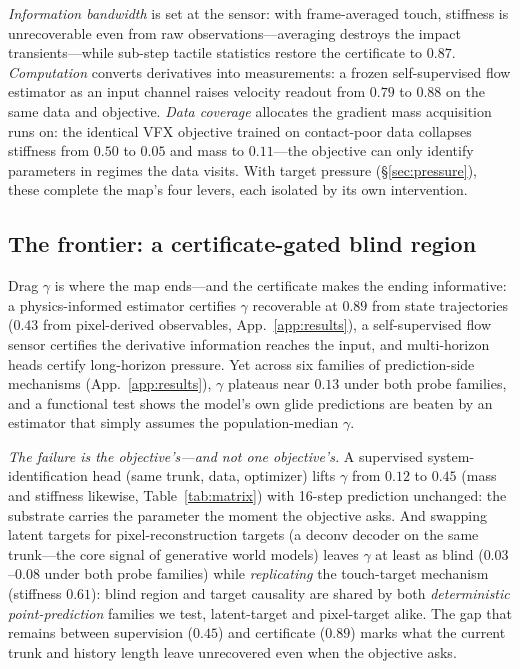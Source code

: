 \documentclass{article} %
\begin{document}
\emph{Information bandwidth} is set at the sensor: with frame-averaged touch,
stiffness is unrecoverable even from raw observations---averaging destroys
the impact transients---while sub-step tactile statistics restore the
certificate to $0.87$.
\emph{Computation} converts derivatives into measurements: a frozen
self-supervised flow estimator as an input channel raises velocity readout
from $0.79$ to $0.88$ on the same data and objective. \emph{Data coverage}
allocates the gradient mass acquisition runs on: the identical VFX objective
trained on contact-poor data collapses stiffness from $0.50$ to $0.05$ and
mass to $0.11$---the objective can only identify parameters in regimes the
data visits. With target pressure (\S\ref{sec:pressure}), these complete the
map's four levers, each isolated by its own intervention.

\subsection{The frontier: a certificate-gated blind region}
\label{sec:frontier}

Drag $\gamma$ is where the map ends---and the certificate makes the ending
informative: a physics-informed estimator certifies $\gamma$ recoverable at
$0.89$ from state trajectories ($0.43$ from pixel-derived observables,
App.~\ref{app:results}), a self-supervised flow sensor certifies the
derivative information reaches the input, and multi-horizon heads certify
long-horizon pressure. Yet across six families of prediction-side
mechanisms (App.~\ref{app:results}), $\gamma$ plateaus near $0.13$ under
both probe families, and a
functional test shows the model's own glide predictions are beaten by an
estimator that simply assumes the population-median $\gamma$.

\emph{The failure is the objective's---and not one objective's.} A
supervised system-identification head (same trunk, data, optimizer)
lifts $\gamma$ from $0.12$ to $0.45$ (mass and stiffness likewise,
Table~\ref{tab:matrix}) with 16-step prediction unchanged: the
substrate carries the parameter the moment the objective asks. And
swapping latent targets for pixel-reconstruction targets (a deconv
decoder on the same trunk---the core signal of generative world models)
leaves $\gamma$ at least as blind ($0.03$--$0.08$ under both
probe families) while \emph{replicating} the touch-target mechanism
(stiffness $0.61$): blind region and target causality are shared by both
\emph{deterministic point-prediction} families we test, latent-target and
pixel-target alike. The gap that remains between supervision ($0.45$) and
certificate ($0.89$) marks what the current trunk and history length leave
unrecovered even when the objective asks.
\end{document}

